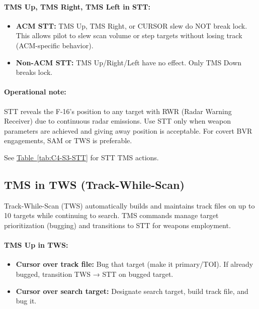 \documentclass[11pt, a4paper, twoside]{report}
\newcommand{\tabref}[1]{\hyperref[#1]{Table~\ref*{#1}}}
\begin{document}
\paragraph{TMS Up, TMS Right, TMS Left in STT:}
\begin{itemize}
    \item \textbf{ACM STT:} TMS Up, TMS Right, or CURSOR slew do NOT break lock. This allows pilot to slew scan volume or step targets without losing track (ACM-specific behavior).
    \item \textbf{Non-ACM STT:} TMS Up/Right/Left have no effect. Only TMS Down breaks lock.
\end{itemize}

\paragraph{Operational note:}
STT reveals the F-16's position to any target with RWR (Radar Warning Receiver) due to continuous radar emissions. Use STT only when weapon parameters are achieved and giving away position is acceptable. For covert BVR engagements, SAM or TWS is preferable.

See \tabref{tab:C4-S3-STT} for STT TMS actions.

\subsection{TMS in TWS (Track-While-Scan)}
\label{sec:C4-S3-S3}

Track-While-Scan (TWS) automatically builds and maintains track files on up to 10 targets while continuing to search. TMS commands manage target prioritization (bugging) and transitions to STT for weapons employment.

\paragraph{TMS Up in TWS:}
\begin{itemize}
    \item \textbf{Cursor over track file:} Bug that target (make it primary/TOI). If already bugged, transition TWS → STT on bugged target.
    \item \textbf{Cursor over search target:} Designate search target, build track file, and bug it.
\end{itemize}
\end{document}
